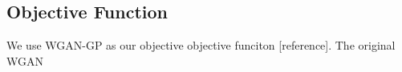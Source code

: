 \subsection{Objective Function}
We use WGAN-GP as our objective objective funciton [reference]. The original WGAN